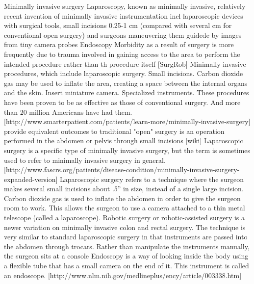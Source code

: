 Minimally invasive surgery
Laparoscopy, known as minimally invasive, relatively recent invention of minimally invasive instrumentation incl laparoscopic devices with surgical tools, small incisions 0.25-1 cm (compared with several cm for conventional open surgery) and surgeons maneuvering them guidede by images from tiny camera probes
Endoscopy
Morbidity as a result of surgery is more frequently due to trauma involved in gaining access to the area to perform the intended procedure rather than th procedure itself [SurgRob]
Minimally invasive procedures, which include laparoscopic surgery.
Small incisions. Carbon dioxide gas may be used to inflate the area, creating a space between the internal organs and the skin. Insert miniature camera. Specialized instruments. These procedures have been proven to be as effective as those of conventional surgery. And more than 20 million Americans have had them. [http://www.smarterpatient.com/patients/learn-more/minimally-invasive-surgery] provide equivalent outcomes to traditional "open" surgery
is an operation performed in the abdomen or pelvis through small incisions [wiki]
Laparoscopic surgery is a specific type of minimally invasive surgery, but the term is sometimes used to refer to minimally invasive surgery in general. [http://www.fascrs.org/patients/disease-condition/minimally-invasive-surgery-expanded-version] Laparoscopic surgery refers to a technique where the surgeon makes several small incisions about .5'' in size, instead of a single large incision. Carbon dioxide gas is used to inflate the abdomen in order to give the surgeon room to work.  This allows the surgeon to use a camera attached to a thin metal telescope (called a laparoscope). Robotic surgery or robotic-assisted surgery is a newer variation on minimally invasive colon and rectal surgery.  The technique is very similar to standard laparoscopic surgery in that instruments are passed into the abdomen through trocars.  Rather than manipulate the instruments manually, the surgeon sits at a console
Endoscopy is a way of looking inside the body using a flexible tube that has a small camera on the end of it. This instrument is called an endoscope. [http://www.nlm.nih.gov/medlineplus/ency/article/003338.htm]




